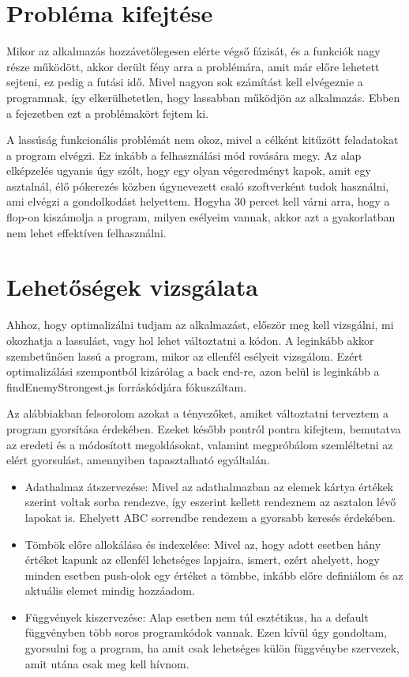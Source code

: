 
\section{Probléma kifejtése}
Mikor az alkalmazás hozzávetőlegesen elérte végső fázisát, és a funkciók nagy része működött, akkor derült fény arra a problémára, amit már előre lehetett sejteni, ez pedig a futási idő.
Mivel nagyon sok számítást kell elvégeznie a programnak, így elkerülhetetlen, hogy lassabban működjön az alkalmazás. Ebben a fejezetben ezt a problémakört fejtem ki.

A lassúság funkcionális problémát nem okoz, mivel a célként kitűzött feladatokat a program elvégzi. Ez inkább a felhasználási mód rovására megy. Az alap elképzelés ugyanis úgy szólt, hogy egy olyan végeredményt kapok, amit egy asztalnál, élő pókerezés közben úgynevezett csaló szoftverként tudok használni, ami elvégzi a gondolkodást helyettem. Hogyha 30 percet kell várni arra, hogy a flop-on kiszámolja a program, milyen esélyeim vannak, akkor azt a gyakorlatban nem lehet effektíven felhasználni.

\section{Lehetőségek vizsgálata}
Ahhoz, hogy optimalizálni tudjam az alkalmazást, először meg kell vizsgálni, mi okozhatja a lassulást, vagy hol lehet változtatni a kódon. A leginkább akkor szembetűnően lassú a program, mikor az ellenfél esélyeit vizsgálom. Ezért optimalizálási szempontból kizárólag a back end-re, azon belül is leginkább a findEnemyStrongest.js forráskódjára fókuszáltam.

Az alábbiakban felsorolom azokat a tényezőket, amiket változtatni terveztem a program gyorsítása érdekében. Ezeket később pontról pontra kifejtem, bemutatva az eredeti és a módosított megoldásokat, valamint megpróbálom szemléltetni az elért gyorsulást, amennyiben tapasztalható egyáltalán.
\begin{itemize}
    \item Adathalmaz átszervezése: Mivel az adathalmazban az elemek kártya értékek szerint voltak sorba rendezve, így eszerint kellett rendeznem az asztalon lévő lapokat is. Ehelyett ABC sorrendbe rendezem a gyorsabb keresés érdekében.
    \item Tömbök előre allokálása és indexelése: Mivel az, hogy adott esetben hány értéket kapunk az ellenfél lehetséges lapjaira, ismert, ezért ahelyett, hogy minden esetben push-olok egy értéket a tömbbe, inkább előre definiálom és az aktuális elemet mindig hozzáadom.
    \item Függvények kiszervezése: Alap esetben nem túl esztétikus, ha a default függvényben több soros programkódok vannak. Ezen kívül úgy gondoltam, gyorsulni fog a program, ha amit csak lehetséges külön függvénybe szervezek, amit utána csak meg kell hívnom.
\end{itemize}

